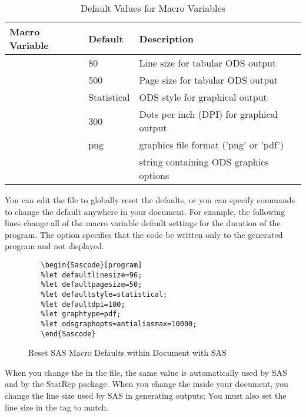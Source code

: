 \documentclass[article,oneside]{memoir}
\newcommand*{\StatRep}{\textsf{StatRep}\xspace}
\begin{document}
  \begin{table}[H]
  \centering\caption{Default Values for Macro Variables}\label{defaults}
  \begin{tabular}{llP{2.5in}}
  \textbf{Macro Variable}    & \textbf{Default} & \textbf{Description}\\
  \hline
      & 80      & Line size for tabular ODS output\\
      & 500     & Page size for tabular ODS output\\
         & Statistical & ODS style for graphical output \\
           & 300      & Dots per inch (DPI) for graphical output\\
            & png      & graphics file format ('png' or 'pdf')\\
         &          & string containing ODS graphics options\\
  \hline
   \end{tabular}
  \end{table}

  You can edit the  file
  to globally reset the defaults, or you can specify commands to change the default anywhere
  in your document. For example, the following lines change all of the macro variable
  default settings for the duration of the program. The  option specifies
  that the code be written only to the generated program and not displayed.


\begin{figure}[H]
\begin{snugshade}
\begin{verbatim}
   \begin{Sascode}[program]
   %let defaultlinesize=96;
   %let defaultpagesize=50;
   %let defaultstyle=statistical;
   %let defaultdpi=100;
   %let graphtype=pdf;
   %let odsgraphopts=antialiasmax=10000;
   \end{Sascode}
\end{verbatim}
\end{snugshade}
\caption{Reset SAS Macro Defaults within Document with SAS}\label{reset}
\end{figure}

  When you change the  in the  file, the same value
  is automatically used by SAS and by the \StatRep package.
  When you change the  inside your document,
  you change the line size used by SAS in generating
  outputs; You must also set the line size in the  tag to match.
\end{document}
